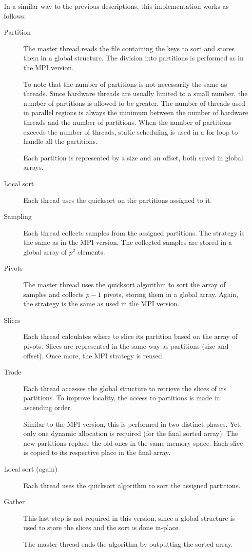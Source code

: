 \documentclass[abstract=on,9pt,twocolumn]{scrartcl}
\begin{document}
In a similar way to the previous descriptions, this implementation works as follows:
\begin{description}
	\item[Partition]{The master thread reads the file containing the keys to sort and stores them in a global structure. The division into partitions is performed as in the MPI version.
	
	To note that the number of partitions is not necessarily the same as threads. Since hardware threads are usually limited to a small number, the number of partitions is allowed to be greater. The number of threads used in parallel regions is always the minimum between the number of hardware threads and the number of partitions. When the number of partitions exceeds the number of threads, static scheduling is used in a for loop to handle all the partitions.
	
	Each partition is represented by a size and an offset, both saved in global arrays.}
	\item[Local sort]{Each thread uses the quicksort on the partitions assigned to it.}
	\item[Sampling]{Each thread collects samples from the assigned partitions. The strategy is the same as in the MPI version. The collected samples are stored in a global array of $p^{2}$ elements.}
	\item[Pivots]{The master thread uses the quicksort algorithm to sort the array of samples and collects $p-1$ pivots, storing them in a global array. Again, the strategy is the same as used in the MPI version.}
	\item[Slices]{Each thread calculates where to slice its partition based on the array of pivots. Slices are represented in the same way as partitions (size and offset). Once more, the MPI strategy is reused.}
	\item[Trade]{Each thread accesses the global structure to retrieve the slices of its partitions. To improve locality, the access to partitions is made in ascending order.
	
	Similar to the MPI version, this is performed in two distinct phases. Yet, only one dynamic allocation is required (for the final sorted array). The new partitions replace the old ones in the same memory space. Each slice is copied to its respective place in the final array.}
	\item[Local sort (again)]{Each thread uses the quicksort algorithm to sort the assigned partitions.}
	\item[Gather]{This last step is not required in this version, since a global structure is used to store the slices and the sort is done in-place.
	
	The master thread ends the algorithm by outputting the sorted array.}
\end{description}
\end{document}

